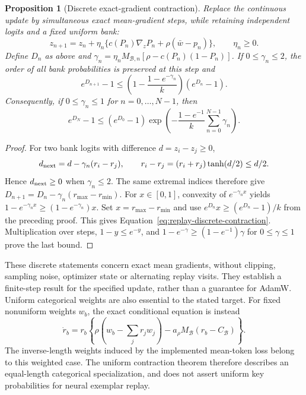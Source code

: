 \documentclass{article}
\newcommand{\enforcehalffinalproseline}{%
  \setlength{\parfillskip}{0pt plus .20\linewidth}}
\newcommand{\1}{\mathbf 1}
\newtheorem{proposition}[lemma]{Proposition}
\theoremstyle{remark}
\theoremstyle{definition}
\theoremstyle{plain}
\begin{document}
\begin{proposition}[Discrete exact-gradient contraction]
\enforcehalffinalproseline
\label{prop:replay-discrete-contraction}
Replace the continuous update by simultaneous exact mean-gradient steps,
while retaining independent logits and a fixed uniform bank:
\[
 z_{n+1}=z_n+\eta_n\{c(P_n)\nabla_zP_n+
                         \rho(\bar w-p_n)\},\qquad \eta_n\ge0.
\]
Define $D_n$ as above and
$\gamma_n=\eta_n M_{\mathcal B,n}
 [\rho-c(P_n)(1-P_n)]$.
If $0\le\gamma_n\le2$, the order of all bank probabilities is preserved
at this step and
\begin{equation}
 e^{D_{n+1}}-1\le
 \left(1-\frac{1-e^{-\gamma_n}}{k}\right)(e^{D_n}-1).
 \label{eq:replay-discrete-contraction}
\end{equation}
Consequently, if $0\le\gamma_n\le1$ for $n=0,\ldots,N-1$, then
\[
 e^{D_N}-1\le(e^{D_0}-1)
  \exp\!\left(-\frac{1-e^{-1}}{k}
                    \sum_{n=0}^{N-1}\gamma_n\right).
\]
\end{proposition}

\begin{proof}
\enforcehalffinalproseline
For two bank logits with difference $d=z_i-z_j\ge0$,
\[
 d_{\rm next}=d-\gamma_n(r_i-r_j),\qquad
 r_i-r_j=(r_i+r_j)\tanh(d/2)\le d/2.
\]
Hence $d_{\rm next}\ge0$ when $\gamma_n\le2$. The same extremal indices
therefore give
$D_{n+1}=D_n-\gamma_n(r_{\max}-r_{\min})$.
For $x\in[0,1]$, convexity of $e^{-\gamma_nx}$ yields
$1-e^{-\gamma_nx}\ge(1-e^{-\gamma_n})x$. Set
$x=r_{\max}-r_{\min}$ and use
$e^{D_n}x\ge(e^{D_n}-1)/k$ from the preceding proof. This gives
Equation~\eqref{eq:replay-discrete-contraction}. Multiplication over steps,
$1-y\le e^{-y}$, and
$1-e^{-\gamma}\ge(1-e^{-1})\gamma$ for $0\le\gamma\le1$ prove the last
bound.
\end{proof}

These discrete statements concern exact mean gradients, without clipping,
sampling noise, optimizer state or alternating replay visits. They establish
a finite-step result for the specified update, rather than a guarantee for
AdamW. Uniform categorical weights are also essential to the stated target.
For fixed nonuniform weights $w_b$, the exact conditional equation is instead
\begin{equation}
 \dot r_b=r_b\left\{
   \rho\left(w_b-\sum_jr_jw_j\right)
   -a_\rho M_{\mathcal B}(r_b-C_{\mathcal B})\right\}.
 \label{eq:replay-finite-weighted}
\end{equation}
The inverse-length weights induced by the implemented mean-token loss belong
to this weighted case. The uniform contraction theorem therefore describes
an equal-length categorical specialization, and does not assert uniform key
probabilities for neural exemplar replay.
\end{document}
